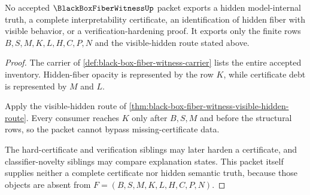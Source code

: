 \begin{theorem}
\label{thm:black-box-fiber-witness-nonescape}
No accepted $\BlackBoxFiberWitnessUp$ packet exports a hidden model-internal truth, a complete interpretability certificate, an identification of hidden fiber with visible behavior, or a verification-hardening proof. It exports only the finite rows $B,S,M,K,L,H,C,P,N$ and the visible-hidden route stated above.
\end{theorem}
\begin{proof}
The carrier of \autoref{def:black-box-fiber-witness-carrier} lists the entire accepted inventory. Hidden-fiber opacity is represented by the row $K$, while certificate debt is represented by $M$ and $L$.

Apply the visible-hidden route of \autoref{thm:black-box-fiber-witness-visible-hidden-route}. Every consumer reaches $K$ only after $B,S,M$ and before the structural rows, so the packet cannot bypass missing-certificate data.

The hard-certificate and verification siblings may later harden a certificate, and classifier-novelty siblings may compare explanation states. This packet itself supplies neither a complete certificate nor hidden semantic truth, because those objects are absent from $F=(B,S,M,K,L,H,C,P,N)$.
\end{proof}


\begin{closurestatus}{\BlackBoxFiberWitnessUp}
  \theoryclosure{\seedClosure}
  \formalstatus{\unformalizedV}
\end{closurestatus}
